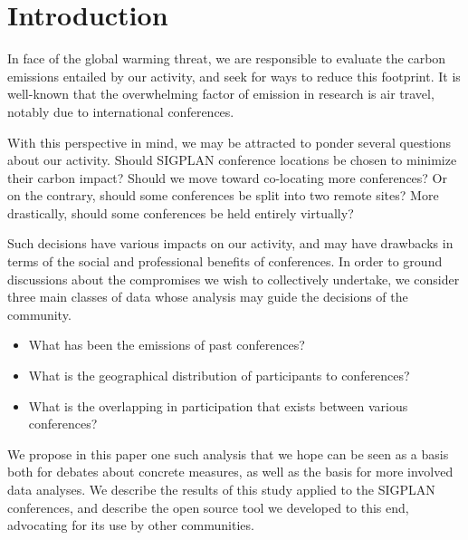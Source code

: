 \section{Introduction}

In face of the global warming threat, we are responsible to evaluate the carbon
emissions entailed by our activity, and seek for ways to reduce this footprint.
It is well-known that the overwhelming factor of emission in research is air travel,
notably due to international conferences.

With this perspective in mind, we may be attracted to ponder several questions
about our activity. Should SIGPLAN conference locations be chosen to minimize
their carbon impact? Should we move toward co-locating more conferences? Or on
the contrary, should some conferences be split into two remote sites?
More drastically, should some conferences be held entirely virtually?

Such decisions have various impacts on our activity, and may have drawbacks in
terms of the social and professional benefits of conferences. 
In order to ground discussions about the compromises we wish to collectively undertake, we consider
three main classes of data whose analysis may guide the decisions of the community.
\begin{itemize}
\item What has been the emissions of past conferences?
\item What is the geographical distribution of participants to conferences?
\item What is the overlapping in participation that exists between various conferences?
\end{itemize}

We propose in this paper one such analysis that we hope can be seen as a basis both for
debates about concrete measures, as well as the basis for more involved data analyses.
We describe the results of this study applied to the SIGPLAN conferences, and describe
the open source tool we developed to this end, advocating for its use by other communities.

